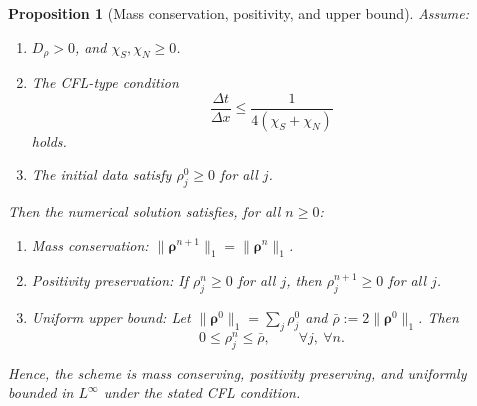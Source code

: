 \documentclass[11pt,twoside]{article}
\theoremstyle{nonumberplain}
\newtheorem{proposition}[theorem]{Proposition}
\newcommand{\brho}{\boldsymbol{\rho}}
\begin{document}
{\begin{proposition}[Mass conservation, positivity, and upper bound]
Assume:
\begin{enumerate}
    \item $D_\rho > 0$, and $\chi_S, \chi_N \ge 0$.
    \item The CFL-type condition
    \begin{equation}\label{eq:CFL}
    \frac{\Delta t}{\Delta x} \le \frac{1}{4(\chi_S + \chi_N)}
    \end{equation}
    holds.
    \item The initial data satisfy $\rho_j^0 \ge 0$ for all $j$.
\end{enumerate}
Then the numerical solution satisfies, for all $n \ge 0$:
\begin{enumerate}
    \item {Mass conservation:} ${\|\brho^{n+1}\|_1 = \|\brho^{n}\|_1}$.
    \item {Positivity preservation:} If $\rho_j^n \ge 0$ for all $j$, then 
    $\rho_j^{n+1} \ge 0$ for all $j$.
    \item {Uniform upper bound:} Let $\|\brho^0\|_1 = \sum_j \rho_j^0$ and 
    $\bar\rho := 2\|\brho^0\|_1$. Then
    \[
    0 \le \rho_j^n \le \bar\rho, \qquad \forall j, \ \forall n.
    \]
\end{enumerate}
Hence, the scheme is mass conserving, positivity preserving, and uniformly bounded in $L^\infty$ under the stated CFL condition.
\end{proposition}






















}
\end{document}
